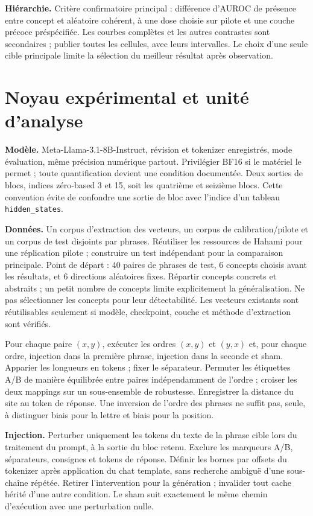 \documentclass[10pt,a4paper]{article}
\begin{document}
\textbf{Hiérarchie.} Critère confirmatoire principal : différence d'AUROC de présence entre concept et aléatoire cohérent, à une dose choisie sur pilote et une couche précoce préspécifiée. Les courbes complètes et les autres contrastes sont secondaires ; publier toutes les cellules, avec leurs intervalles. Le choix d'une seule cible principale limite la sélection du meilleur résultat après observation.

\section{Noyau expérimental et unité d'analyse}
\textbf{Modèle.} Meta-Llama-3.1-8B-Instruct, révision et tokenizer enregistrés, mode évaluation, même précision numérique partout. Privilégier BF16 si le matériel le permet ; toute quantification devient une condition documentée. Deux sorties de blocs, indices zéro-based 3 et 15, soit les quatrième et seizième blocs. Cette convention évite de confondre une sortie de bloc avec l'indice d'un tableau \texttt{hidden\_states}.

\textbf{Données.} Un corpus d'extraction des vecteurs, un corpus de calibration/pilote et un corpus de test disjoints par phrases. Réutiliser les ressources de Hahami pour une réplication pilote ; construire un test indépendant pour la comparaison principale. Point de départ : 40 paires de phrases de test, 6 concepts choisis avant les résultats, et 6 directions aléatoires fixes. Répartir concepts concrets et abstraits ; un petit nombre de concepts limite explicitement la généralisation. Ne pas sélectionner les concepts pour leur détectabilité. Les vecteurs existants sont réutilisables seulement si modèle, checkpoint, couche et méthode d'extraction sont vérifiés.

Pour chaque paire $(x,y)$, exécuter les ordres $(x,y)$ et $(y,x)$ et, pour chaque ordre, injection dans la première phrase, injection dans la seconde et sham. Apparier les longueurs en tokens ; fixer le séparateur. Permuter les étiquettes A/B de manière équilibrée entre paires indépendamment de l'ordre ; croiser les deux mappings sur un sous-ensemble de robustesse. Enregistrer la distance du site au token de réponse. Une inversion de l'ordre des phrases ne suffit pas, seule, à distinguer biais pour la lettre et biais pour la position.

\textbf{Injection.} Perturber uniquement les tokens du texte de la phrase cible lors du traitement du prompt, à la sortie du bloc retenu. Exclure les marqueurs A/B, séparateurs, consignes et tokens de réponse. Définir les bornes par offsets du tokenizer après application du chat template, sans recherche ambiguë d'une sous-chaîne répétée. Retirer l'intervention pour la génération ; invalider tout cache hérité d'une autre condition. Le sham suit exactement le même chemin d'exécution avec une perturbation nulle.
\end{document}
